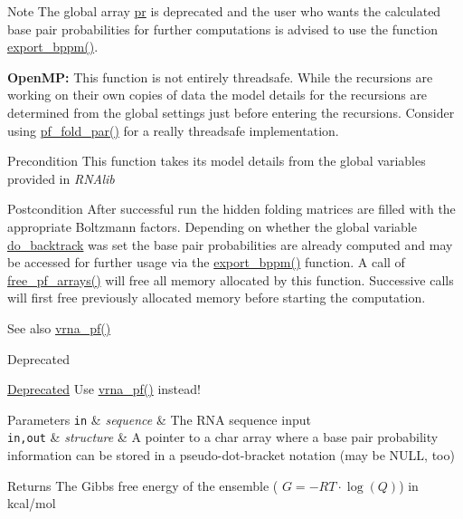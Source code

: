 \begin{DoxyNote}{Note}
The global array \hyperlink{fold__vars_8h_ac98ec419070aee6831b44e5c700f090f}{pr} is deprecated and the user who wants the calculated base pair probabilities for further computations is advised to use the function \hyperlink{group__pf__fold_gac5ac7ee281aae1c5cc5898a841178073}{export\+\_\+bppm()}. 

{\bfseries Open\+M\+P\+:} This function is not entirely threadsafe. While the recursions are working on their own copies of data the model details for the recursions are determined from the global settings just before entering the recursions. Consider using \hyperlink{group__pf__fold_gac4f95bee734b2563a3d6e9932117ebdf}{pf\+\_\+fold\+\_\+par()} for a really threadsafe implementation. 
\end{DoxyNote}
\begin{DoxyPrecond}{Precondition}
This function takes its model details from the global variables provided in {\itshape R\+N\+Alib} 
\end{DoxyPrecond}
\begin{DoxyPostcond}{Postcondition}
After successful run the hidden folding matrices are filled with the appropriate Boltzmann factors. Depending on whether the global variable \hyperlink{group__model__details_gad512b5dd4dbec60faccfe137bb474489}{do\+\_\+backtrack} was set the base pair probabilities are already computed and may be accessed for further usage via the \hyperlink{group__pf__fold_gac5ac7ee281aae1c5cc5898a841178073}{export\+\_\+bppm()} function. A call of \hyperlink{group__pf__fold_gae73db3f49a94f0f72e067ecd12681dbd}{free\+\_\+pf\+\_\+arrays()} will free all memory allocated by this function. Successive calls will first free previously allocated memory before starting the computation. 
\end{DoxyPostcond}
\begin{DoxySeeAlso}{See also}
\hyperlink{group__pf__fold_ga29e256d688ad221b78d37f427e0e99bc}{vrna\+\_\+pf()} 
\end{DoxySeeAlso}
\begin{DoxyRefDesc}{Deprecated}
\item[\hyperlink{deprecated__deprecated000095}{Deprecated}]Use \hyperlink{group__pf__fold_ga29e256d688ad221b78d37f427e0e99bc}{vrna\+\_\+pf()} instead! 
\begin{DoxyParams}[1]{Parameters}
\mbox{\tt in}  & {\em sequence} & The R\+N\+A sequence input \\
\hline
\mbox{\tt in,out}  & {\em structure} & A pointer to a char array where a base pair probability information can be stored in a pseudo-\/dot-\/bracket notation (may be N\+U\+L\+L, too) \\
\hline
\end{DoxyParams}
\begin{DoxyReturn}{Returns}
The Gibbs free energy of the ensemble ( $G = -RT \cdot \log(Q) $) in kcal/mol 
\end{DoxyReturn}
\end{DoxyRefDesc}
